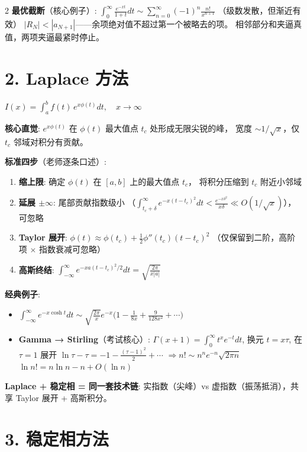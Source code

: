 \documentclass[10pt,a4paper]{article}
\begin{document}
\begin{multicols}{2}
\textbf{最优截断}（核心例子）:
$\int_0^\infty \frac{e^{-xt}}{1+t}dt \sim \sum_{n=0}^{\infty}(-1)^n\frac{n!}{x^{n+1}}$
（级数发散，但渐近有效）
$|R_N| < |a_{N+1}|$——余项绝对值不超过第一个被略去的项。
相邻部分和夹逼真值，两项夹逼最紧时停止。


\section{2. Laplace 方法}

$I(x) = \int_a^b f(t)\, e^{x\phi(t)}dt,\quad x \to \infty$

\textbf{核心直觉}: $e^{x\phi(t)}$ 在 $\phi(t)$ 最大值点 $t_c$ 处形成无限尖锐的峰，
宽度 $\sim 1/\sqrt{x}$，仅 $t_c$ 邻域对积分有贡献。

\textbf{标准四步}（老师逐条口述）:
\begin{enumerate}
\item \textbf{缩上限}: 确定 $\phi(t)$ 在 $[a,b]$ 上的最大值点 $t_c$，
将积分压缩到 $t_c$ 附近小邻域
\item \textbf{延展 $\pm\infty$}: 尾部贡献指数级小
（$\int_{t_c+\delta}^\infty e^{-x(t-t_c)^2}dt < \frac{e^{-x\delta^2}}{x\delta} \ll O(1/\sqrt{x})$），可忽略
\item \textbf{Taylor 展开}: $\phi(t) \approx \phi(t_c) + \frac{1}{2}\phi''(t_c)(t-t_c)^2$
（仅保留到二阶，高阶项 $\times$ 指数衰减可忽略）
\item \textbf{高斯终结}: $\int_{-\infty}^{\infty} e^{-x a (t-t_c)^2/2} dt = \sqrt{\frac{2\pi}{x|a|}}$
\end{enumerate}

\textbf{经典例子}:
\begin{itemize}
\item $\int_{-\infty}^{\infty} e^{-x\cosh t}dt \sim \sqrt{\frac{2\pi}{x}}e^{-x}\bigl(1-\frac{1}{8x}+\frac{9}{128x^2}+\cdots\bigr)$
\item \textbf{Gamma → Stirling}（考试核心）:
$\Gamma(x+1)=\int_0^\infty t^x e^{-t}dt$, 换元 $t=x\tau$,
在 $\tau=1$ 展开 $\ln\tau-\tau = -1 - \frac{(\tau-1)^2}{2} + \cdots$
$\Rightarrow \boxed{n! \sim n^n e^{-n} \sqrt{2\pi n}}$
$\ln n! = n\ln n - n + O(\ln n)$
\end{itemize}

\textbf{Laplace + 稳定相 = 同一套技术链}:
实指数（尖峰）vs 虚指数（振荡抵消），共享 Taylor 展开 + 高斯积分。


\section{3. 稳定相方法}


\end{multicols}
\end{document}
